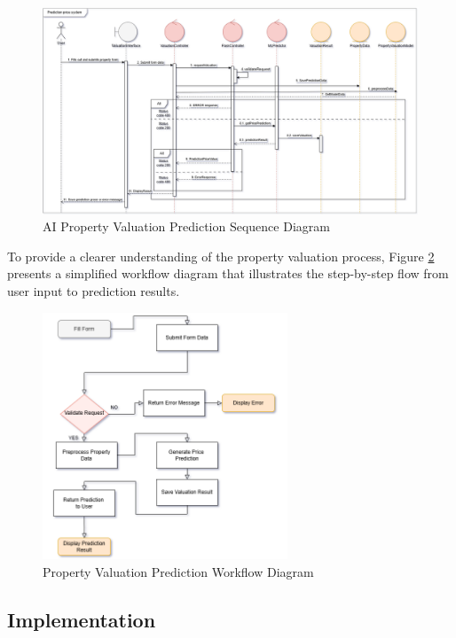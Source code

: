 \begin{figure}[htbp]
    \centering
    \includegraphics[width=1.1\textwidth]{images/sequence_AI_prediction_model.png}
    \caption{AI Property Valuation Prediction Sequence Diagram}
    \label{fig:ai-prediction-sequence-model}
\end{figure}

To provide a clearer understanding of the property valuation process, Figure \ref{fig:valuation-workflow} presents a simplified workflow diagram that illustrates the step-by-step flow from user input to prediction results.
\newpage
\begin{figure}[htbp]
    \centering
    \includegraphics[width=0.65\textwidth]{images/valuation_workflow_diagram.png}
    \caption{Property Valuation Prediction Workflow Diagram}
    \label{fig:valuation-workflow}
\end{figure}

\subsection{Implementation}
